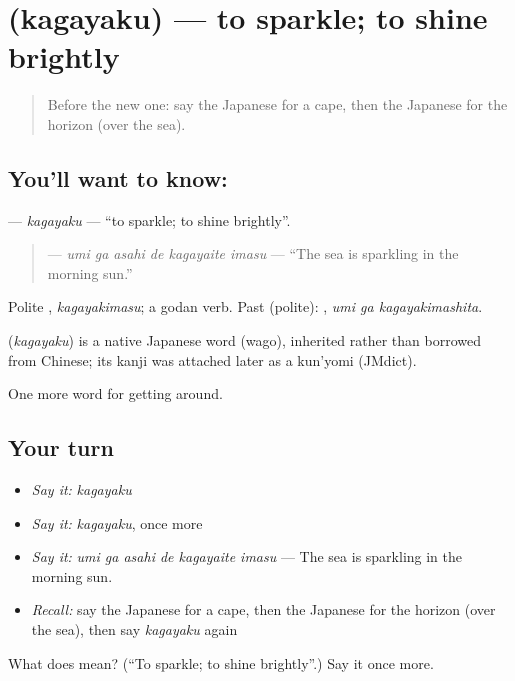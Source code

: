 \section[\texorpdfstring{\ja{かがやく} (kagayaku)}{かがやく (kagayaku)}]{ (kagayaku) — to sparkle; to shine brightly}

\label{lesson:JA-C382-kagayaku}



\begin{quote}
Before the new one: say the Japanese for a cape, then the Japanese for the horizon (over the sea).
\end{quote}

\subsection*{You'll want to know: }
\textbf{} — \emph{kagayaku} — \textquotedblleft{}to sparkle; to shine brightly\textquotedblright{}.

\begin{quote}
\textbf{  } — \emph{umi ga asahi de kagayaite imasu} — \textquotedblleft{}The sea is sparkling in the morning sun.\textquotedblright{}
\end{quote}

Polite \textbf{}, \emph{kagayakimasu}; a godan verb. Past (polite): \textbf{ }, \emph{umi ga kagayakimashita}.

\begin{cousinweb}
\textbf{} (\emph{kagayaku}) is a native Japanese word (wago), inherited rather than borrowed from Chinese; its kanji was attached later as a kun'yomi (JMdict).
\end{cousinweb}

\begin{grammarlens}[title={What you've built}]
One more word for getting around.
\end{grammarlens}

\subsection*{Your turn}
\begin{itemize}
\raggedright
  \item \emph{Say it:} \emph{kagayaku}
  \item \emph{Say it:} \emph{kagayaku}, once more
  \item \emph{Say it:} \emph{umi ga asahi de kagayaite imasu} — The sea is sparkling in the morning sun.
  \item \emph{Recall:} say the Japanese for a cape, then the Japanese for the horizon (over the sea), then say \emph{kagayaku} again
\end{itemize}

\begin{tcolorbox}[breakable,colback=teal!4,colframe=teal!35!black,title={Before you move on}]
What does  mean? (\textquotedblleft{}To sparkle; to shine brightly\textquotedblright{}.) Say it once more.
\end{tcolorbox}
